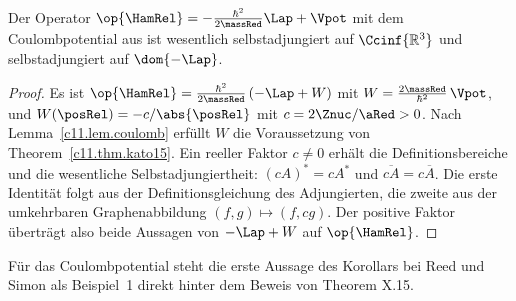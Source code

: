 \begin{fundament}
  \begin{corollary}[Relativbewegung]\label{c11.cor.relativ}
    Der Operator $\op{\HamRel} = -\frac{\hbar^2}{2\massRed}\Lap + \Vpot$ mit dem
    Coulombpotential aus  ist wesentlich selbstadjungiert auf
    $\Ccinf{\mathbb{R}^3}$ und selbstadjungiert auf $\dom{-\Lap}$.
  \end{corollary}
  \begin{proof}
    Es ist $\op{\HamRel} = \frac{\hbar^2}{2\massRed}\,(-\Lap + W)$ mit
    $W = \frac{2\massRed}{\hbar^2}\,\Vpot$, und $W(\posRel) = -c/\abs{\posRel}$ mit
    $c = 2\Znuc/\aRed > 0$. Nach Lemma~\ref{c11.lem.coulomb} erfüllt $W$ die
    Voraussetzung von Theorem~\ref{c11.thm.kato15}. Ein reeller Faktor $c \neq 0$
    erhält die Definitionsbereiche und die wesentliche Selbstadjungiertheit:
    $(cA)^* = cA^*$ und $\overline{cA} = c\overline{A}$. Die erste Identität folgt aus
    der Definitionsgleichung des Adjungierten, die zweite aus der umkehrbaren
    Graphenabbildung $(f,g) \mapsto (f,cg)$. Der positive Faktor überträgt also beide
    Aussagen von $-\Lap + W$ auf $\op{\HamRel}$.
  \end{proof}

  Für das Coulombpotential steht die erste Aussage des Korollars bei Reed und Simon als
  Beispiel~1 direkt hinter dem Beweis von Theorem X.15.


\end{fundament}
